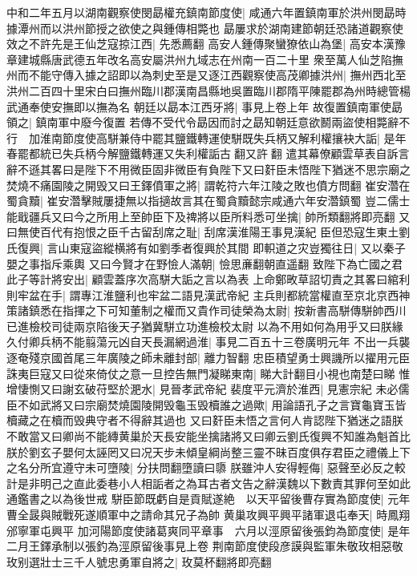 中和二年五月以湖南觀察使閔勗權充鎮南節度使|{
	咸通六年置鎮南軍於洪州閔勗時據潭州而以洪州節授之欲使之與鍾傳相斃也}
勗屢求於湖南建節朝廷恐諸道觀察使效之不許先是王仙芝寇掠江西|{
	先悉薦翻}
高安人鍾傳聚蠻獠依山為堡|{
	高安本漢豫章建城縣唐武德五年改名高安屬洪州九域志在州南一百二十里}
衆至萬人仙芝陷撫州而不能守傳入據之詔即以為刺史至是又逐江西觀察使高茂卿據洪州|{
	撫州西北至洪州二百四十里宋白曰撫州臨川郡漢南昌縣地吳置臨川郡隋平陳罷郡為州時總管楊武通奉使安撫即以撫為名}
朝廷以勗本江西牙將|{
	事見上卷上年}
故復置鎮南軍使勗領之|{
	鎮南軍中廢今復置}
若傳不受代令勗因而討之勗知朝廷意欲鬭兩盜使相斃辭不行　加淮南節度使高駢兼侍中罷其鹽鐵轉運使駢既失兵柄又解利權攘袂大詬|{
	是年春罷都統已失兵柄今解鹽鐵轉運又失利權詬古翻又許翻}
遣其幕僚顧雲草表自訴言辭不遜其畧曰是陛下不用微臣固非微臣有負陛下又曰姧臣未悟陛下猶迷不思宗廟之焚燒不痛園陵之開毁又曰王鐸僨軍之將|{
	謂乾符六年江陵之敗也僨方問翻}
崔安濳在蜀貪黷|{
	崔安濳擊賊屢捷無以指擿故言其在蜀貪黷懿宗咸通六年安濳鎮蜀}
豈二儒士能戢疆兵又曰今之所用上至帥臣下及禆將以臣所料悉可坐擒|{
	帥所類翻將即亮翻}
又曰無使百代有抱恨之臣千古留刮席之耻|{
	刮席漢淮陽王事見漢紀}
臣但恐寇生東土劉氏復興|{
	言山東寇盜縱横將有如劉季者復興於其間}
即軹道之灾豈獨往日|{
	又以秦子嬰之事指斥乘輿}
又曰今賢才在野憸人滿朝|{
	憸思亷翻朝直遥翻}
致陛下為亡國之君此子等計將安出|{
	顧雲蓋序次高駢大詬之言以為表}
上命鄭畋草詔切責之其畧曰綰利則牢盆在手|{
	謂專江淮鹽利也牢盆二語見漢武帝紀}
主兵則都統當權直至京北京西神策諸鎮悉在指揮之下可知董制之權而又貴作司徒榮為太尉|{
	按新書高駢傳駢帥西川已進檢校司徒兩京陷後天子猶冀駢立功進檢校太尉}
以為不用如何為用乎又曰朕緣久付卿兵柄不能翦蕩元凶自天長漏網過淮|{
	事見二百五十三卷廣明元年}
不出一兵襲逐奄殘京國首尾三年廣陵之師未離封部|{
	離力智翻}
忠臣積望勇士興譏所以擢用元臣誅夷巨寇又曰從來倚仗之意一旦控告無門凝睇東南|{
	睇大計翻目小視也南楚曰睇}
惟增悽惻又曰謝玄破苻堅於淝水|{
	見晉孝武帝紀}
裴度平元濟於淮西|{
	見憲宗紀}
未必儒臣不如武將又曰宗廟焚燒園陵開毁龜玉毁櫝誰之過歟|{
	用論語孔子之言寶龜寶玉皆櫝藏之在櫝而毁典守者不得辭其過也}
又曰姧臣未悟之言何人肯認陛下猶迷之語朕不敢當又曰卿尚不能縳黄巢於天長安能坐擒諸將又曰卿云劉氏復興不知誰為魁首比朕於劉玄子嬰何太誣罔又曰况天步未傾皇綱尚整三靈不昧百度俱存君臣之禮儀上下之名分所宜遵守未可墮陵|{
	分扶問翻墮讀曰隳}
朕雖沖人安得輕侮|{
	惡聲至必反之較計是非明己之直此委巷小人相詬者之為耳古者文告之辭漢魏以下數責其罪何至如此通鑑書之以為後世戒}
駢臣節既虧自是貢賦遂絶　以天平留後曹存實為節度使|{
	元年曹全晸與賊戰死遂順軍中之請命其兄子為帥}
黄巢攻興平興平諸軍退屯奉天|{
	時鳳翔邠寧軍屯興平}
加河陽節度使諸葛爽同平章事　六月以涇原留後張鈞為節度使|{
	是年二月王鐸承制以張釣為涇原留後事見上卷}
荆南節度使段彦謨與監軍朱敬玫相惡敬玫别選壯士三千人號忠勇軍自將之|{
	玫莫杯翻將即亮翻}
